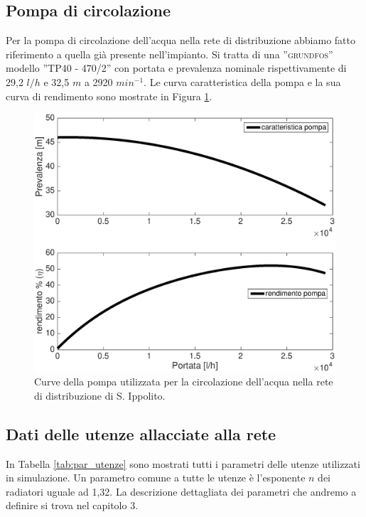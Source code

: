 \documentclass[laurea,oneside,11pt]{USiena_tesiLM}
\begin{document}
\subsection{Pompa di circolazione}

Per la pompa di circolazione dell'acqua nella rete di distribuzione abbiamo fatto riferimento a quella già presente nell'impianto. Si tratta di una ''\textsc{grundfos}'' modello ''\textsc{TP40 - 470/2}'' con portata e prevalenza nominale rispettivamente di 29,2 $l/h$ e 32,5 $m$ a 2920 $min^{-1}$.
Le curva caratteristica della pompa e la sua curva di rendimento sono mostrate in Figura \ref{fig:curve_pompa}.

\begin{figure}[!ht]
\centering
\includegraphics[width=\textwidth]{figure/curve_pompa} 
\caption{Curve della pompa utilizzata per la circolazione dell'acqua nella rete di distribuzione di S. Ippolito. }
\label{fig:curve_pompa}
\end{figure}

\subsection{Dati delle utenze allacciate alla rete}
In Tabella \ref{tab:par_utenze} sono mostrati tutti i parametri delle utenze utilizzati in simulazione. Un parametro comune a tutte le utenze è l'esponente $n$ dei radiatori uguale ad 1,32.
La descrizione dettagliata dei parametri che andremo a definire si trova nel capitolo 3. 
\end{document}
